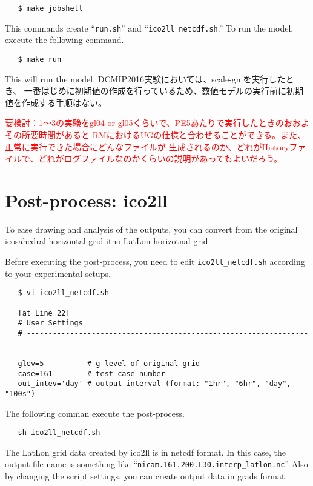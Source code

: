  \begin{verbatim}
   $ make jobshell
 \end{verbatim}

This commands create ``\verb|run.sh|'' and ``\verb|ico2ll_netcdf.sh|.''
To run the model, execute the following command.

 \begin{verbatim}
   $ make run
 \end{verbatim}

This will run the model.
DCMIP2016実験においては、scale-gmを実行したとき、
一番はじめに初期値の作成を行っているため、数値モデルの実行前に初期値を作成する手順はない。

\textcolor{red}{要検討：1〜3の実験をgl04 or gl05くらいで、PE5あたりで実行したときのおおよその所要時間があると
 RMにおけるUGの仕様と合わせることができる。また、正常に実行できた場合にどんなファイルが
 生成されるのか、どれがHistoryファイルで、どれがログファイルなのかくらいの説明があってもよいだろう。}


\section{Post-process: ico2ll}
To ease drawing and analysis of the outputs, you can convert 
from the original icosahedral horizontal grid itno LatLon horizotnal grid.

Before executing the post-process, you need to edit \verb|ico2ll_netcdf.sh|
according to your experimental setups.
 \begin{verbatim}
   $ vi ico2ll_netcdf.sh

   [at Line 22]
   # User Settings
   # ---------------------------------------------------------------------

   glev=5          # g-level of original grid
   case=161        # test case number
   out_intev='day' # output interval (format: "1hr", "6hr", "day", "100s")
 \end{verbatim}

 \noindent The following comman execute the post-process.
 \begin{verbatim}
   sh ico2ll_netcdf.sh
 \end{verbatim}


 \noindent The LatLon grid data created by ico2ll is in netcdf format. 
In this case, the output file name is something like 
``\verb|nicam.161.200.L30.interp_latlon.nc|''
Also by changing the script settings, you can create output data in 
grads format. 
